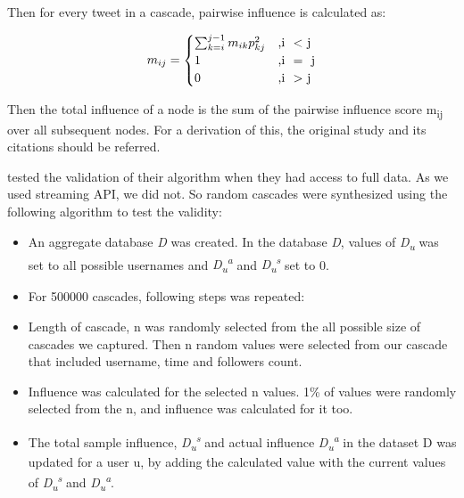 \documentclass[letterpaper]{article}
\begin{document}
Then for every tweet in a cascade, pairwise influence is calculated as:

\begin{equation}
    m_{ij} =
      \begin{cases}
        \sum_{k=i}^{j-1}m_{ik}p_{kj}^2 & \text{,i \ \textless \ j}\\
        1 & \text{,i \ = \ j}\\
        0 & \text{,i \ \textgreater \ j}
      \end{cases}       
    \end{equation}

Then the total influence of a node is the sum of the pairwise influence score m\textsubscript{ij} over all subsequent nodes. For a derivation of this, the original study
 \cite{rizoiu2018debatenight} and its citations should be referred. \par

 \cite{rizoiu2018debatenight} tested the validation of their algorithm when they had access to full data. As we used streaming API, we did not. So random cascades were synthesized using the following algorithm 
 to test the validity:
 
 \begin{itemize}
    \item An aggregate database \textit{D} was created. In the database \textit{D}, values of \textit{D\textsubscript{u}} was set to all possible usernames  and \textit{D\textsubscript{u}\textsuperscript{a}}
     and \textit{D\textsubscript{u}\textsuperscript{s}} set to 0.
    \item For 500000 cascades, following steps was repeated:
    \setlength{\itemindent}{+.3in}
    \item Length of cascade, n was randomly selected from the all possible size of cascades we captured. Then n random values were selected from our cascade that included 
    username, time and followers count.
    \item Influence was calculated for the selected n values. 1\% of values were randomly selected from the n, and influence was calculated for it too.
    \item The total sample influence, \textit{D\textsubscript{u}\textsuperscript{s}} and actual influence \textit{D\textsubscript{u}\textsuperscript{a}} in the dataset D was updated for a user u,
    by adding the calculated value with the current values of \textit{D\textsubscript{u}\textsuperscript{s}} and \textit{D\textsubscript{u}\textsuperscript{a}}.
 \end{itemize}
\end{document}

